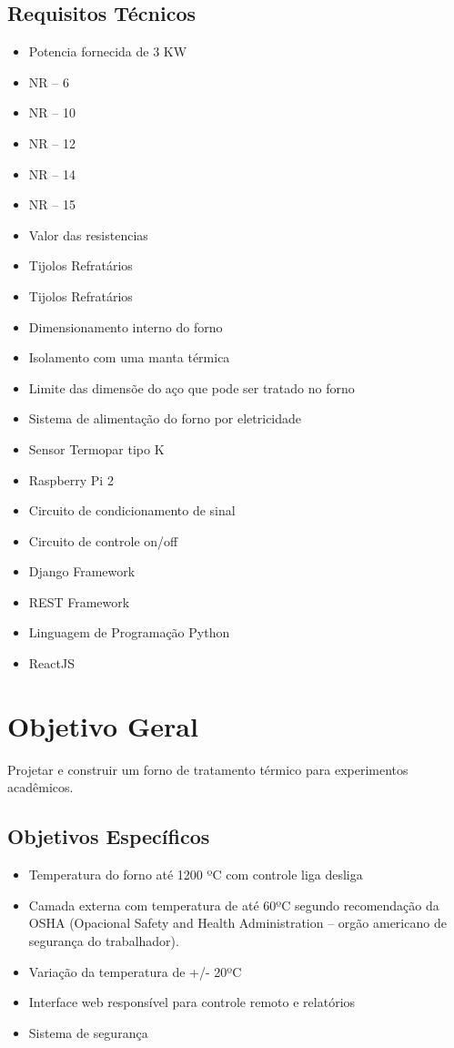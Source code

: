 \subsection{Requisitos Técnicos}

\begin{itemize}
	\item Potencia fornecida de 3 KW
	\item NR – 6
	\item NR – 10
	\item NR – 12
	\item NR – 14
	\item NR – 15
	\item Valor das resistencias 
	\item Tijolos Refratários 
	\item Tijolos Refratários 
	\item Dimensionamento interno do forno  
	\item Isolamento com uma manta térmica 
	\item Limite das dimensõe do aço que pode ser tratado no forno 
	\item Sistema de alimentação do forno por eletricidade 
	\item Sensor Termopar tipo K
	\item Raspberry Pi 2
	\item Circuito de condicionamento de sinal
	\item Circuito de controle on/off
	\item Django Framework
	\item REST Framework
	\item Linguagem de Programação Python
	\item ReactJS
\end{itemize}

\section{Objetivo Geral}

Projetar e construir um forno de tratamento térmico para experimentos acadêmicos.

\subsection{Objetivos Específicos}

\begin{itemize}
	\item Temperatura do forno até 1200 ºC com controle liga desliga
	\item Camada externa com temperatura de até 60ºC segundo recomendação da OSHA (Opacional Safety and Health Administration – orgão americano de segurança do trabalhador).
	\item Variação da temperatura de +/- 20ºC
	\item Interface web responsível para controle remoto e relatórios
	\item Sistema de segurança
	
\end{itemize}
